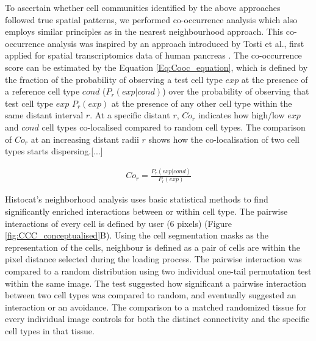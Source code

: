 To ascertain whether cell communities identified by the above approaches followed true spatial patterns, we performed co-occurrence analysis which also employs similar principles as in the nearest neighbourhood approach. This co-occurrence analysis was inspired by an approach introduced by Tosti et al., first applied for spatial transcriptomics data of human pancreas \cite{tosti2021single}. The co-occurrence score can be estimated by the Equation \ref{Eq:Cooc_equation}, which is defined by the fraction of the probability of observing a test cell type $exp$ at the presence of a reference cell type $cond$ ($P_{r}(exp|cond)$) over the probability of observing that test cell type $exp$ $P_{r}(exp)$ at the presence of any other cell type within the same distant interval $r$. At a specific distant $r$, $Co_{r}$ indicates how high/low $exp$ and $cond$ cell types co-localised compared to random cell types. The comparison of $Co_{r}$ at an increasing distant radii $r$ shows how the co-localisation of two cell types starts dispersing.[...]


\begin{align}
\label{Eq:Cooc_equation}
Co_{r} = \frac{P_{r}(exp|cond)}{P_{r}(exp)} 
\end{align}


Histocat's neighborhood analysis uses  basic statistical methods to find significantly enriched interactions between or within cell type. The pairwise interactions of every cell is defined by user (6 pixels) (Figure \ref{fig:CCC_conceptualised}B). Using the cell segmentation masks as the representation of the cells, neighbour is defined as a pair of cells are within the pixel distance selected during the loading process. The pairwise interaction was compared to a random distribution using two individual one-tail permutation test within the same image. The test suggested how significant a pairwise interaction between two cell types was compared to random, and eventually suggested an interaction or an avoidance. The comparison to a matched randomized tissue for every individual image controls for both the distinct connectivity and the specific cell types in that tissue. 

